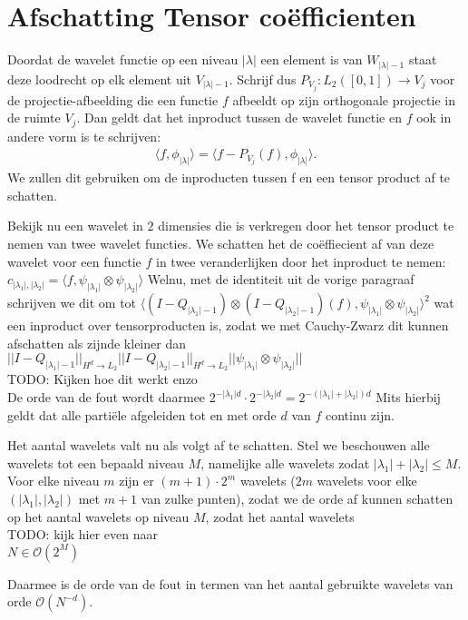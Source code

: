 \documentclass[11pt]{amsart}
\title{}
\author{Okke van Garderen}
\renewcommand{\O}{\mathcal{O}}
\newcommand{\eq}[1]{\begin{eqnarray*} #1 \end{eqnarray*}}
\newcommand{\abso}[1]{{|#1|}}
\begin{document}
\maketitle
\section{Afschatting Tensor co\"efficienten}
Doordat de wavelet functie op een niveau $\abso{\lambda}$ een element is van $W_{\abso{\lambda}-1}$
staat deze loodrecht op elk element uit $V_{\abso{\lambda}-1}$.
Schrijf dus $P_{V_j} : L_2([0,1]) \rightarrow V_j$ voor de projectie-afbeelding die een
functie $f$ afbeeldt op zijn orthogonale projectie in de ruimte $V_j$.
Dan geldt dat het inproduct tussen de wavelet functie en $f$ ook in andere vorm is te schrijven:
\eq{
  \langle f , \phi_\abso{\lambda} \rangle = \langle f - P_{V_j}(f) , \phi_\abso{\lambda} \rangle.
}
We zullen dit gebruiken om de inproducten tussen f en een tensor product af te schatten. \bigskip

Bekijk nu een wavelet in $2$ dimensies die is verkregen door het tensor product te nemen
van twee wavelet functies. We schatten het de co\"effiecient af van deze wavelet voor een 
functie $f$ in twee veranderlijken door het inproduct te nemen:
$c_{\abso{\lambda_1},\abso{\lambda_2}} = \langle f , \psi_{\abso{\lambda_1}} \otimes \psi_{\abso{\lambda_2}} \rangle$ 
Welnu, met de identiteit uit de vorige paragraaf schrijven we dit om tot 
$\langle (I - Q_{\abso{\lambda_1}-1})\otimes(I - Q_{\abso{\lambda_2}-1})(f),\psi_{\abso{\lambda_1}} \otimes \psi_{\abso{\lambda_2}} \rangle^2$
wat een inproduct over tensorproducten is, zodat we met Cauchy-Zwarz dit kunnen afschatten als zijnde kleiner dan
$||I-Q_{\abso{\lambda_1} -1}||_{H^d\rightarrow L_2} ||I-Q_{\abso{\lambda_2} -1}||_{H^d\rightarrow L_2} ||\psi_{\abso{\lambda_1}}\otimes\psi_{\abso{\lambda_2}}||$
\\{\Large TODO: Kijken hoe dit werkt enzo} \\
De orde van de fout wordt daarmee $2^{-\abso{\lambda_1} d} \cdot 2^{-\abso{\lambda_2} d} = 2^{-(\abso{\lambda_1}+\abso{\lambda_2})d}$
Mits hierbij geldt dat alle parti\"ele afgeleiden tot en met orde $d$ van $f$ continu zijn. \bigskip

Het aantal wavelets valt nu als volgt af te schatten. Stel we beschouwen alle wavelets tot een bepaald niveau $M$, namelijke alle wavelets zodat
$\abso{\lambda_1}+\abso{\lambda_2} \leq M$. Voor elke niveau $m$ zijn er $(m+1) \cdot 2^m$ wavelets ($2m$ wavelets voor elke $(\abso{\lambda_1},\abso{\lambda_2})$ met $m+1$ van zulke punten), zodat we de orde af kunnen schatten op het aantal wavelets
op niveau $M$, zodat het aantal wavelets 
\\{\Large TODO: kijk hier even naar}\\ 
$N \in \O(2^M)$

Daarmee is de orde van de fout in termen van het aantal gebruikte wavelets van orde $\O(N^{-d})$.
\end{document}
